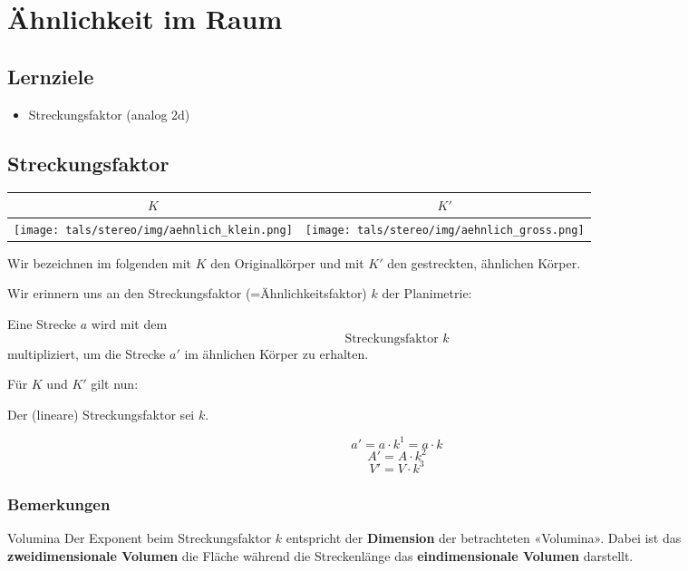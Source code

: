 \section{Ähnlichkeit im Raum}


\subsection*{Lernziele}
\begin{itemize}
\item Streckungsfaktor (analog 2d)
\end{itemize}
\newpage

\subsection{Streckungsfaktor}

\begin{tabular}{cc}
  $K$ & $K'$ \\
  \hline
  \texttt{[image: tals/stereo/img/aehnlich\_klein.png]} & \texttt{[image: tals/stereo/img/aehnlich\_gross.png]}\\%
\end{tabular} 

Wir bezeichnen im folgenden mit $K$ den Originalkörper und mit $K'$ den gestreckten, ähnlichen Körper.

Wir erinnern uns an den Streckungsfaktor (=Ähnlichkeitsfaktor) $k$ der Planimetrie:
\begin{definition}{}{}
  Eine Strecke $a$ wird mit dem
  $$\text{Streckungsfaktor} \,\, k$$
  multipliziert, um die Strecke $a'$ im ähnlichen Körper zu erhalten.
\end{definition}

Für $K$ und $K'$ gilt nun:

\begin{gesetz}{}{}
  Der (lineare) Streckungsfaktor sei $k$.

  $$a' = a \cdot{} k^1 = a\cdot{}k $$
  $$A' = A \cdot{} k^2 $$
  $$V' = V \cdot{} k^3 $$
\end{gesetz}
\newpage
\subsubsection{Bemerkungen}
\begin{bemerkung}{Volumina}{}
Der Exponent beim Streckungsfaktor $k$ entspricht der \textbf{Dimension} der
betrachteten «Volumina». Dabei ist das \textbf{zweidimensionale Volumen} die
Fläche während die Streckenlänge das \textbf{eindimensionale Volumen} darstellt.
\end{bemerkung}

